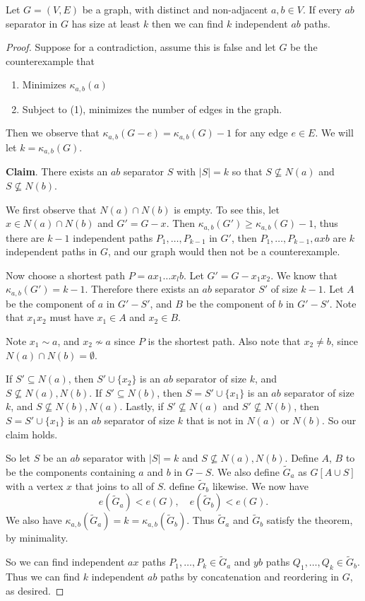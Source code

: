 \documentclass[a4paper]{scrreprt}
\begin{document}
\begin{theorem}
	Let $G = (V, E)$ be a graph, with distinct and non-adjacent $a, b \in V$. If every $ab$ separator in $G$ has size at least $k$ then we can find $k$ independent $ab$ paths.
\end{theorem}
\begin{proof}
	Suppose for a contradiction, assume this is false and let $G$ be the counterexample that 
	\begin{enumerate}[label=(\arabic*)]
		\item Minimizes $\kappa_{a, b}(a)$
		\item Subject to (1), minimizes the number of edges in the graph.
	\end{enumerate}
	Then we observe that $\kappa_{a, b}(G - e) = \kappa_{a, b}(G) - 1$ for any edge $e \in E$. We will let $k = \kappa_{a, b}(G)$.

	\textbf{Claim}. There exists an $ab$ separator $S$ with $|S| = k$ so that $S \not \subseteq N(a)$ and $S \not \subseteq N(b)$.

	We first observe that $N(a) \cap N(b)$ is empty. To see this, let $x \in N(a) \cap N(b)$ and $G' = G-x$. Then $\kappa_{a, b}(G') \geq \kappa_{a, b}(G) - 1$, thus there are $k - 1$ independent paths $P_1, \dots, P_{k - 1}$ in $G'$, then $P_1, \dots, P_{k - 1}, axb$ are $k$ independent paths in $G$, and our graph would then not be a counterexample.

	Now choose a shortest path $P = a x_1 \dots x_l b$. Let $G' = G - x_1 x_2$. We know that $\kappa_{a, b}(G') = k - 1$. Therefore there exists an $ab$ separator $S'$ of size $k - 1$.
	Let $A$ be the component of $a$ in $G' - S'$, and $B$ be the component of $b$ in $G' - S'$. Note that $x_1x_2$ must have $x_1 \in A$ and $x_2 \in B$. 

	Note $x_1 \sim a$, and $x_2 \not \sim a$ since $P$ is the shortest path. Also note that $x_2 \neq b$, since $N(a) \cap N(b) = \emptyset$. 

	If $S' \subseteq N(a)$, then $S' \cup \{x_2\}$ is an $ab$ separator of size $k$, and $S \not \subseteq N(a), N(b)$. If $S' \subseteq N(b)$, then $S = S' \cup \{x_1\}$ is an $ab$ separator of size $k$, and $S \not \subseteq N(b), N(a)$. Lastly, if $S' \not \subseteq N(a)$ and $S' \not \subseteq N(b)$, then $S = S' \cup \{x_1\}$ is an $ab$ separator of size $k$ that is not in $N(a)$ or $N(b)$. So our claim holds.

	So let $S$ be an $ab$ separator with $|S| = k$ and $S \not \subseteq N(a), N(b)$. Define $A$, $B$ to be the components containing $a$ and $b$ in $G - S$. We also define $\tilde{G}_a$ as $G[A\cup S]$ with a vertex $x$ that joins to all of $S$. define $\tilde{G}_b$ likewise. We now have
	$$
	e(\tilde{G}_a) < e(G), \quad e(\tilde{G}_b) < e(G).
	$$
	We also have $\kappa_{a, b}(\tilde{G}_a) = k = \kappa_{a, b}(\tilde{G}_b)$. Thus $\tilde{G}_a$ and $\tilde{G}_b$ satisfy the theorem, by minimality. 

	So we can find independent $ax$ paths $P_1, \dots, P_k \in \tilde{G}_a$ and $yb$ paths $Q_1, \dots, Q_k \in \tilde{G}_b$. Thus we can find $k$ independent $ab$ paths by concatenation and reordering in $G$, as desired.
\end{proof}
\end{document}
